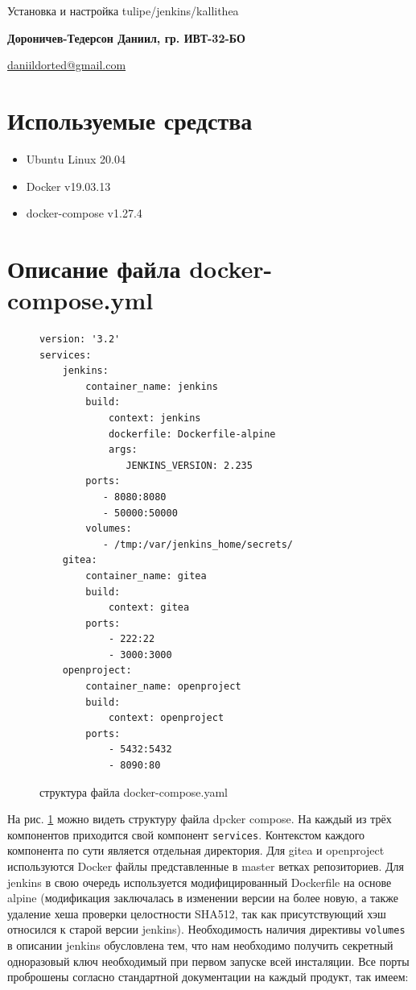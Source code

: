 \documentclass[a4paper]{extarticle}
\begin{document}
\begin{center}
        
    \vspace{0.4cm}
    \large
    Установка и настройка tulipe/jenkins/kallithea
        
    \vspace{0.4cm}
    \textbf{Дороничев-Тедерсон Даниил, гр. ИВТ-32-БО}
       
    \vspace{0.3cm}
    \href{mailto:daniildorted@gmail.com}{daniildorted@gmail.com}
\end{center}

\section{Используемые средства}

\begin{itemize}
\item Ubuntu Linux 20.04
\item Docker v19.03.13
\item docker-compose v1.27.4
\end{itemize}

\section{Описание файла docker-compose.yml}

\begin{figure}[h!]
\begin{verbatim}
version: '3.2'
services:
    jenkins:
        container_name: jenkins
        build:
            context: jenkins
            dockerfile: Dockerfile-alpine
            args:
               JENKINS_VERSION: 2.235
        ports:
           - 8080:8080
           - 50000:50000
        volumes:
           - /tmp:/var/jenkins_home/secrets/
    gitea:
        container_name: gitea
        build:
            context: gitea
        ports:
            - 222:22
            - 3000:3000
    openproject:
        container_name: openproject
        build:
            context: openproject
        ports:
            - 5432:5432
            - 8090:80
\end{verbatim}
\caption{структура файла docker-compose.yaml}
\label{fig:dcy}
\end{figure}

На рис. \ref{fig:dcy} можно видеть структуру файла dpcker compose. На каждый из трёх компонентов приходится свой компонент \texttt{services}. Контекстом каждого компонента по сути является отдельная директория. Для gitea и openproject используются Docker файлы представленные в master ветках репозиториев. Для jenkins в свою очередь используется модифицированный Dockerfile на основе alpine (модификация заключалась в изменении версии на более новую, а также удаление хеша  проверки целостности SHA512, так как присутствующий хэш относился к старой версии jenkins). Необходимость наличия директивы \texttt{volumes} в описании jenkins обусловлена тем, что нам необходимо получить секретный одноразовый ключ необходимый при первом запуске всей	инсталяции.
Все порты проброшены согласно стандартной документации на каждый продукт, так имеем:
\end{document}
